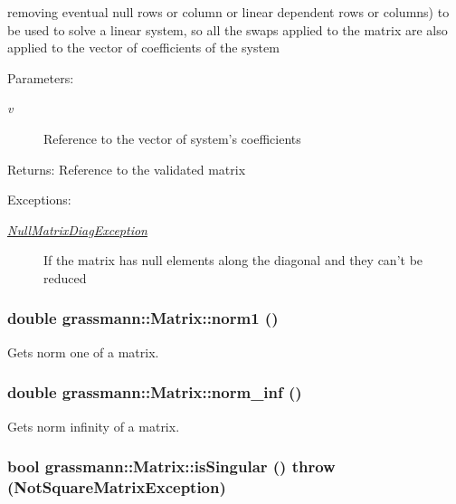 removing eventual null rows or column or linear dependent rows or columns) to be used to solve a linear system, so all the swaps applied to the matrix are also applied to the vector of coefficients of the system \begin{Desc}
\item[Parameters:]
\begin{description}
\item[{\em v}]Reference to the vector of system's coefficients \end{description}
\end{Desc}
\begin{Desc}
\item[Returns:]Reference to the validated matrix \end{Desc}
\begin{Desc}
\item[Exceptions:]
\begin{description}
\item[{\em \hyperlink{classgrassmann_1_1NullMatrixDiagException}{NullMatrixDiagException}}]If the matrix has null elements along the diagonal and they can't be reduced \end{description}
\end{Desc}
\hypertarget{classgrassmann_1_1Matrix_7ebc9791efda5a822aae68f153ab63c1}{
\subsubsection[norm1]{\setlength{\rightskip}{0pt plus 5cm}double grassmann::Matrix::norm1 ()}}
\label{classgrassmann_1_1Matrix_7ebc9791efda5a822aae68f153ab63c1}


Gets norm one of a matrix. 

\hypertarget{classgrassmann_1_1Matrix_17d00cd96a3e8ce02740b90b14d2dadb}{
\subsubsection[norm\_\-inf]{\setlength{\rightskip}{0pt plus 5cm}double grassmann::Matrix::norm\_\-inf ()}}
\label{classgrassmann_1_1Matrix_17d00cd96a3e8ce02740b90b14d2dadb}


Gets norm infinity of a matrix. 

\hypertarget{classgrassmann_1_1Matrix_02841902fbf25602ef2a49ada709e993}{
\subsubsection[isSingular]{\setlength{\rightskip}{0pt plus 5cm}bool grassmann::Matrix::isSingular ()  throw ({\bf NotSquareMatrixException})}}
\label{classgrassmann_1_1Matrix_02841902fbf25602ef2a49ada709e993}


